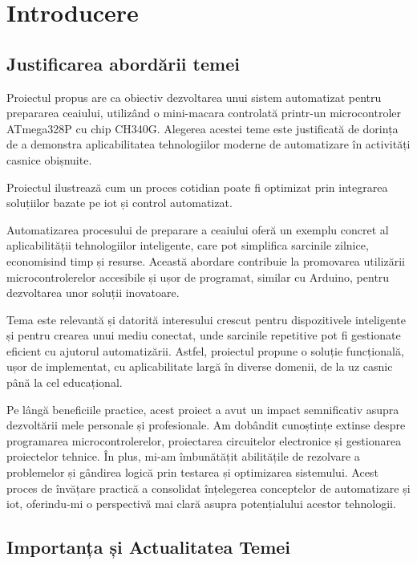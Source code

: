 \chapter{Introducere}
\label{chap:intro} 

\section{Justificarea abordării temei}
\label{sec:justification}

Proiectul propus are ca obiectiv dezvoltarea %
unui sistem automatizat pentru prepararea %
ceaiului, utilizând o mini-macara %
controlată printr-un microcontroler ATmega328P %
cu chip CH340G. Alegerea acestei teme este %
justificată de dorința de a demonstra %
aplicabilitatea tehnologiilor moderne de %
automatizare în activități casnice obișnuite. %

Proiectul ilustrează cum un proces %
cotidian poate fi optimizat prin %
integrarea soluțiilor bazate pe \gls{iot} %
și control automatizat. %

Automatizarea procesului de preparare a %
ceaiului oferă un exemplu concret al %
aplicabilității tehnologiilor inteligente, %
care pot simplifica sarcinile zilnice, %
economisind timp și resurse. Această %
abordare contribuie la promovarea %
utilizării microcontrolerelor accesibile %
și ușor de programat, similar cu Arduino, %
pentru dezvoltarea unor soluții %
inovatoare. %

Tema este relevantă și datorită %
interesului crescut pentru dispozitivele %
inteligente și pentru crearea unui mediu %
conectat, unde sarcinile repetitive pot fi %
gestionate eficient cu ajutorul %
automatizării. Astfel, proiectul propune %
o soluție funcțională, ușor de implementat, %
cu aplicabilitate largă în diverse domenii, %
de la uz casnic până la cel educațional. %

Pe lângă beneficiile practice, %
acest proiect a avut un impact semnificativ %
asupra dezvoltării mele personale și %
profesionale. Am dobândit cunoștințe %
extinse despre programarea %
microcontrolerelor, proiectarea %
circuitelor electronice și gestionarea %
proiectelor tehnice. În plus, mi-am %
îmbunătățit abilitățile de rezolvare a %
problemelor și gândirea logică prin %
testarea și optimizarea sistemului. %
Acest proces de învățare practică a %
consolidat înțelegerea conceptelor de %
automatizare și \gls{iot}, oferindu-mi o %
perspectivă mai clară asupra %
potențialului acestor tehnologii.

\section{Importanța și Actualitatea Temei}
\label{sec:importance}

